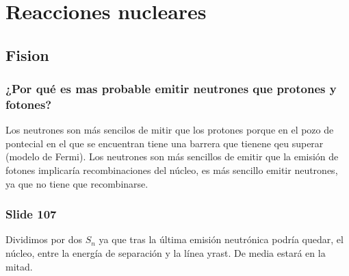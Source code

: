 \chapter{Reacciones nucleares}

\section{Fision}

\subsection{¿Por qué es mas probable emitir neutrones que protones y fotones?}

Los neutrones son más sencilos de mitir que los protones porque en el pozo de pontecial en el que se encuentran tiene una barrera que tienene qeu superar (modelo de Fermi). Los neutrones son más sencillos de emitir que la emisión de fotones implicaría recombinaciones del núcleo, es más sencillo emitir neutrones, ya que no tiene que recombinarse. 

\subsection{Slide 107}

Dividimos por dos $S_n$ ya que tras la última emisión neutrónica podría quedar, el núcleo, entre la energía de separación y la línea yrast. De media estará en la mitad.